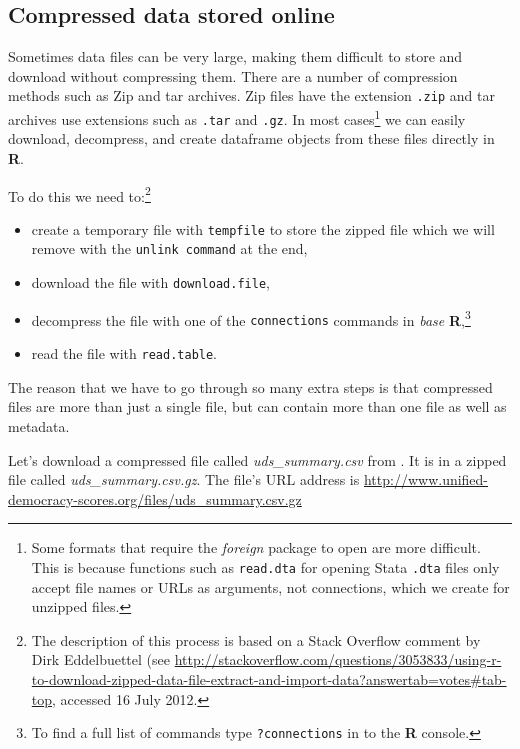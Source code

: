 \documentclass[ChapterTOCs,krantz1]{krantz}\usepackage{graphicx, color}
\begin{document}
\subsection{Compressed data stored online}

Sometimes data files can be very large, making them difficult to store and download without compressing them. There are a number of compression methods such as Zip and tar archives. Zip files have the extension {\tt{.zip}} and tar archives use extensions such as {\tt{.tar}} and {\tt{.gz}}. In most cases\footnote{Some formats that require the {\emph{foreign}} package to open are more difficult. This is because functions such as {\tt{read.dta}} for opening Stata {\tt{.dta}} files only accept file names or URLs as arguments, not connections, which we create for unzipped files.} we can easily download, decompress, and create dataframe objects from these files directly in {\bf{R}}. 

To do this we need to:\footnote{The description of this process is based on a Stack Overflow comment by Dirk Eddelbuettel (see {\url{http://stackoverflow.com/questions/3053833/using-r-to-download-zipped-data-file-extract-and-import-data?answertab=votes\#tab-top}}, accessed 16 July 2012.}

\begin{itemize}
    \item create a temporary file with {\tt{tempfile}} to store the zipped file which we will remove with the {\tt{unlink command}} at the end,
    \item download the file with {\tt{download.file}},
    \item decompress the file with one of the {\tt{connections}} commands in {\emph{base}} {\bf{R}},\footnote{To find a full list of commands type {\tt{?connections}} in to the {\bf{R}} console.}
    \item read the file with {\tt{read.table}}. 
\end{itemize}

The reason that we have to go through so many extra steps is that compressed files are more than just a single file, but can contain more than one file as well as metadata.

Let's download a compressed file called {\emph{uds\_summary.csv}} from \cite{Pemstein2010}. It is in a zipped file called {\emph{uds\_summary.csv.gz}}. The file's URL address is {\url{http://www.unified-democracy-scores.org/files/uds_summary.csv.gz}}
\end{document}
